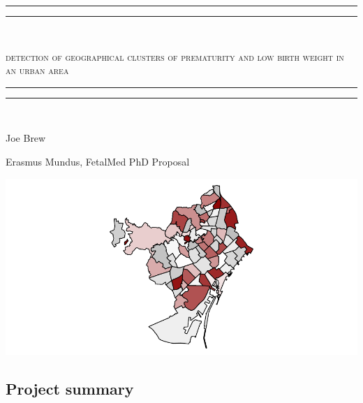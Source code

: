 \documentclass{article}
\begin{document}





\begin{center}

\rule{\textwidth}{1.6pt}\vspace*{-\baselineskip}\vspace*{2pt} %
\rule{\textwidth}{0.4pt}\\[\baselineskip] %


\begin{LARGE}
\scshape{detection of geographical clusters of prematurity and low birth weight in an urban area}
\end{LARGE}

\rule{\textwidth}{0.4pt}\vspace*{-\baselineskip}\vspace{3.2pt} %
\rule{\textwidth}{1.6pt}\\[\baselineskip] %

\vspace{10mm}

\begin{Large}
Joe Brew
\end{Large}
\vspace{3mm}

\begin{large}
Erasmus Mundus, FetalMed PhD Proposal 
\end{large}

\vspace{20mm}
\includegraphics{protocol-001}

\vspace{20mm}


\subsection*{Project summary}

\end{center}
\end{document}
